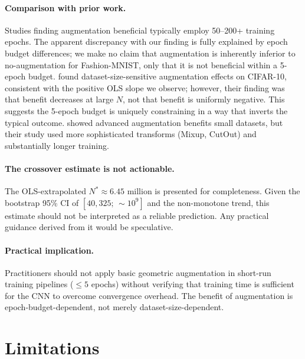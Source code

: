 \documentclass[11pt]{article}
\begin{document}
\paragraph{Comparison with prior work.}
Studies finding augmentation beneficial
\citep{pham2018deep,snider2023using,kumar2025enhancing} typically employ
50--200+ training epochs.
The apparent discrepancy with our finding is fully explained by epoch budget
differences; we make no claim that augmentation is inherently inferior to
no-augmentation for Fashion-MNIST, only that it is not beneficial within a
5-epoch budget.
\citet{karada2020empirical} found dataset-size-sensitive augmentation effects on
CIFAR-10, consistent with the positive OLS slope we observe; however, their
finding was that benefit decreases at large $N$, not that benefit is uniformly
negative.
This suggests the 5-epoch budget is uniquely constraining in a way that
inverts the typical outcome.
\citet{kang2024game} showed advanced augmentation benefits small datasets, but
their study used more sophisticated transforms (Mixup, CutOut) and substantially
longer training.

\paragraph{The crossover estimate is not actionable.}
The OLS-extrapolated $N^\ast \approx 6.45$ million is presented for
completeness.
Given the bootstrap 95\% CI of $[40{,}325;\, {\sim}10^9]$ and the non-monotone
trend, this estimate should not be interpreted as a reliable prediction.
Any practical guidance derived from it would be speculative.

\paragraph{Practical implication.}
Practitioners should not apply basic geometric augmentation in short-run training
pipelines ($\leq 5$ epochs) without verifying that training time is sufficient
for the CNN to overcome convergence overhead.
The benefit of augmentation is epoch-budget-dependent, not merely
dataset-size-dependent.

\section{Limitations}
\label{sec:limitations}
\end{document}
